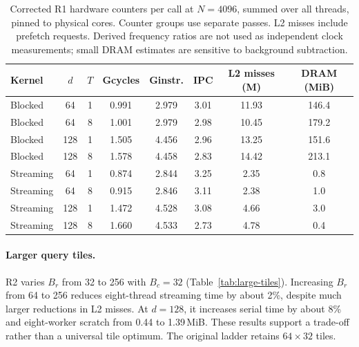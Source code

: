 \documentclass[11pt,a4paper]{article}
\begin{document}
\begin{table}[!htbp]
\centering
\fontsize{9}{11}\selectfont
\setlength{\tabcolsep}{5pt}
\renewcommand{\arraystretch}{1.16}
\caption{Corrected R1 hardware counters per call at $N=4096$,
summed over all threads, pinned to physical cores. Counter groups use separate
passes. L2 misses include prefetch requests. Derived frequency ratios are not
used as independent clock measurements; small DRAM estimates are sensitive
to background subtraction.}
\label{tab:counters}
\begin{tabular}{@{}lcc ccccc@{}}
\toprule
Kernel & $d$ & $T$ & Gcycles & Ginstr. & IPC & L2 misses (M) & DRAM (MiB) \\
\midrule
Blocked & 64 & 1 & 0.991 & 2.979 & 3.01 & 11.93 & 146.4 \\
Blocked & 64 & 8 & 1.001 & 2.979 & 2.98 & 10.45 & 179.2 \\
Blocked & 128 & 1 & 1.505 & 4.456 & 2.96 & 13.25 & 151.6 \\
Blocked & 128 & 8 & 1.578 & 4.458 & 2.83 & 14.42 & 213.1 \\
\midrule
Streaming & 64 & 1 & 0.874 & 2.844 & 3.25 & 2.35 & 0.8 \\
Streaming & 64 & 8 & 0.915 & 2.846 & 3.11 & 2.38 & 1.0 \\
Streaming & 128 & 1 & 1.472 & 4.528 & 3.08 & 4.66 & 3.0 \\
Streaming & 128 & 8 & 1.660 & 4.533 & 2.73 & 4.78 & 0.4 \\
\bottomrule
\end{tabular}
\end{table}

\paragraph{Larger query tiles.}
R2 varies $B_r$ from 32 to 256 with $B_c=32$ (Table~\ref{tab:large-tiles}).
Increasing $B_r$ from 64 to 256 reduces eight-thread streaming time by about
2\%, despite much larger reductions in L2 misses. At $d=128$, it increases
serial time by about 8\% and eight-worker scratch from 0.44 to 1.39\,MiB.
These results support a trade-off rather than a universal tile optimum.
The original ladder retains $64\times32$ tiles.
\end{document}
